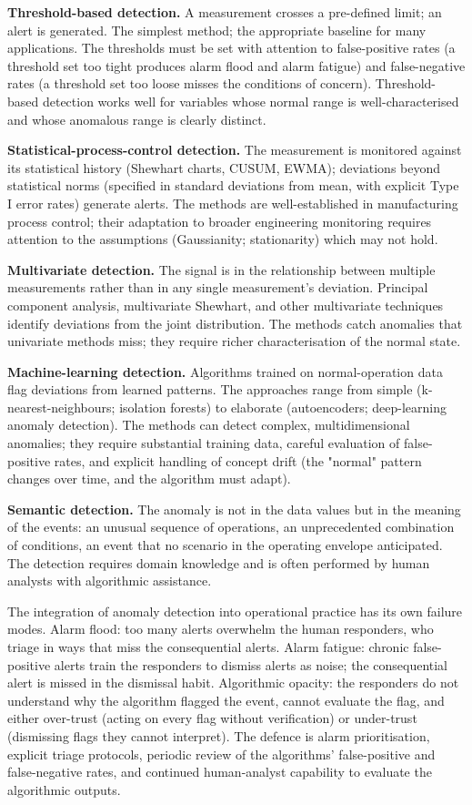 \textbf{Threshold-based detection.} A measurement crosses a pre-defined limit; an alert is generated. The simplest method; the appropriate baseline for many applications. The thresholds must be set with attention to false-positive rates (a threshold set too tight produces alarm flood and alarm fatigue) and false-negative rates (a threshold set too loose misses the conditions of concern). Threshold-based detection works well for variables whose normal range is well-characterised and whose anomalous range is clearly distinct.

\textbf{Statistical-process-control detection.} The measurement is monitored against its statistical history (Shewhart charts, CUSUM, EWMA); deviations beyond statistical norms (specified in standard deviations from mean, with explicit Type I error rates) generate alerts. The methods are well-established in manufacturing process control; their adaptation to broader engineering monitoring requires attention to the assumptions (Gaussianity; stationarity) which may not hold.

\textbf{Multivariate detection.} The signal is in the relationship between multiple measurements rather than in any single measurement's deviation. Principal component analysis, multivariate Shewhart, and other multivariate techniques identify deviations from the joint distribution. The methods catch anomalies that univariate methods miss; they require richer characterisation of the normal state.

\textbf{Machine-learning detection.} Algorithms trained on normal-operation data flag deviations from learned patterns. The approaches range from simple (k-nearest-neighbours; isolation forests) to elaborate (autoencoders; deep-learning anomaly detection). The methods can detect complex, multidimensional anomalies; they require substantial training data, careful evaluation of false-positive rates, and explicit handling of concept drift (the "normal" pattern changes over time, and the algorithm must adapt).

\textbf{Semantic detection.} The anomaly is not in the data values but in the meaning of the events: an unusual sequence of operations, an unprecedented combination of conditions, an event that no scenario in the operating envelope anticipated. The detection requires domain knowledge and is often performed by human analysts with algorithmic assistance.

The integration of anomaly detection into operational practice has its own failure modes. Alarm flood: too many alerts overwhelm the human responders, who triage in ways that miss the consequential alerts. Alarm fatigue: chronic false-positive alerts train the responders to dismiss alerts as noise; the consequential alert is missed in the dismissal habit. Algorithmic opacity: the responders do not understand why the algorithm flagged the event, cannot evaluate the flag, and either over-trust (acting on every flag without verification) or under-trust (dismissing flags they cannot interpret). The defence is alarm prioritisation, explicit triage protocols, periodic review of the algorithms' false-positive and false-negative rates, and continued human-analyst capability to evaluate the algorithmic outputs.

